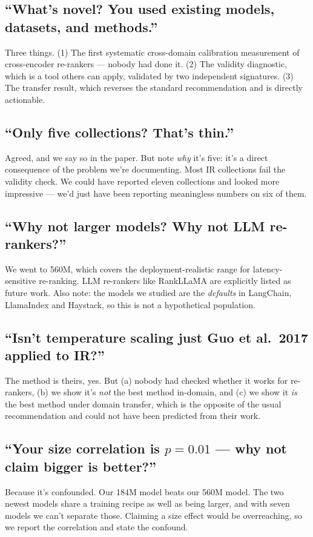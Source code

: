 \documentclass[11pt,a4paper]{article}
\begin{document}
\subsection*{``What's novel? You used existing models, datasets, and methods.''}
Three things. (1) The first systematic cross-domain calibration measurement of
cross-encoder re-rankers --- nobody had done it. (2) The validity diagnostic, which is
a tool others can apply, validated by two independent signatures. (3) The transfer
result, which reverses the standard recommendation and is directly actionable.

\subsection*{``Only five collections? That's thin.''}
Agreed, and we say so in the paper. But note \emph{why} it's five: it's a direct
consequence of the problem we're documenting. Most IR collections fail the validity
check. We could have reported eleven collections and looked more impressive --- we'd
just have been reporting meaningless numbers on six of them.

\subsection*{``Why not larger models? Why not LLM re-rankers?''}
We went to 560M, which covers the deployment-realistic range for latency-sensitive
re-ranking. LLM re-rankers like RankLLaMA are explicitly listed as future work. Also
note: the models we studied are the \emph{defaults} in LangChain, LlamaIndex and
Haystack, so this is not a hypothetical population.

\subsection*{``Isn't temperature scaling just Guo et al.\ 2017 applied to IR?''}
The method is theirs, yes. But (a) nobody had checked whether it works for
re-rankers, (b) we show it's \emph{not} the best method in-domain, and (c) we show
it \emph{is} the best method under domain transfer, which is the opposite of the
usual recommendation and could not have been predicted from their work.

\subsection*{``Your size correlation is $p = 0.01$ --- why not claim bigger is better?''}
Because it's confounded. Our 184M model beats our 560M model. The two newest models
share a training recipe as well as being larger, and with seven models we can't
separate those. Claiming a size effect would be overreaching, so we report the
correlation and state the confound.
\end{document}
